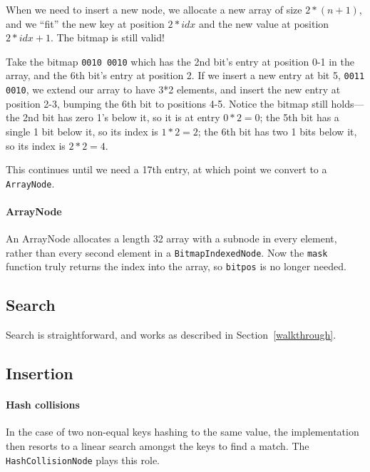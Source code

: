 \documentclass[preprint]{sigplanconf}
\begin{document}
When we need to insert a new node, we allocate
a new array of size $2*(n+1)$, and we ``fit''
the new key at position $2*idx$ and the new
value at position $2*idx+1$.
The bitmap is still valid!

Take the bitmap \texttt{0010 0010}
which has the 2nd bit's entry
at position 0-1 in the array, 
and the 6th bit's entry at position
2.
If we insert a new entry at bit 5,
\texttt{0011 0010}, 
we extend our array to have 3*2 elements,
and insert the new entry at position
2-3, bumping the 6th bit to positions
4-5.
Notice the bitmap still holds---the 2nd
bit has zero 1's below it, so it is at
entry $0*2 = 0$; the 5th bit has a single 1 bit below 
it, so its index is $1*2 = 2$; the 6th bit has
two 1 bits below it, so its index is $2*2 = 4$.

This continues until we need a 17th entry, at
which point we convert to a \texttt{ArrayNode}.

\paragraph{ArrayNode}


An ArrayNode allocates a length 32 array with a subnode
in every element, rather than every second element
in a \texttt{BitmapIndexedNode}.
Now the \texttt{mask} function truly returns the
index into the array, so \texttt{bitpos}
is no longer needed.


\subsection{Search}

Search is straightforward, and works as described
in Section~\ref{walkthrough}.

\subsection{Insertion}

\paragraph{Hash collisions}
In the case of two non-equal keys hashing to the same value,
the implementation then resorts to a linear search amongst
the keys to find a match.
The \texttt{HashCollisionNode} plays this role.
\end{document}

